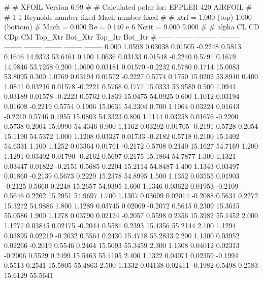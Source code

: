 #  
#       XFOIL         Version 6.99
#  
# Calculated polar for: EPPLER 420 AIRFOIL                              
#  
# 1 1 Reynolds number fixed          Mach number fixed         
#  
# xtrf =   1.000 (top)        1.000 (bottom)  
# Mach =   0.000     Re =     0.140 e 6     Ncrit =   9.000  9.000
#  
#   alpha    CL        CD       CDp       CM     Top_Xtr  Bot_Xtr  Top_Itr  Bot_Itr
#  ------ -------- --------- --------- -------- -------- -------- -------- --------
   0.000   1.0598   0.03038   0.01505  -0.2248   0.5813   0.1646  14.9373  53.6461
   0.100   1.0636   0.03133   0.01548  -0.2240   0.5791   0.1679  14.9846  53.7258
   0.200   1.0690   0.03181   0.01570  -0.2232   0.5780   0.1714  15.0083  53.8095
   0.300   1.0769   0.03194   0.01572  -0.2227   0.5774   0.1750  15.0202  53.8940
   0.400   1.0841   0.03216   0.01578  -0.2221   0.5768   0.1777  15.0333  53.9589
   0.500   1.0941   0.03189   0.01578  -0.2223   0.5762   0.1839  15.0475  54.0925
   0.600   1.1012   0.03194   0.01608  -0.2219   0.5754   0.1906  15.0631  54.2304
   0.700   1.1064   0.03224   0.01643  -0.2210   0.5746   0.1955  15.0803  54.3323
   0.800   1.1114   0.03258   0.01676  -0.2200   0.5738   0.2004  15.0990  54.4346
   0.900   1.1162   0.03292   0.01705  -0.2191   0.5728   0.2054  15.1190  54.5372
   1.000   1.1208   0.03327   0.01733  -0.2182   0.5718   0.2100  15.1402  54.6331
   1.100   1.1252   0.03364   0.01761  -0.2172   0.5708   0.2140  15.1627  54.7169
   1.200   1.1291   0.03402   0.01790  -0.2162   0.5697   0.2175  15.1864  54.7877
   1.300   1.1321   0.03447   0.01822  -0.2151   0.5685   0.2204  15.2114  54.8487
   1.400   1.1343   0.03497   0.01860  -0.2139   0.5673   0.2229  15.2378  54.8995
   1.500   1.1352   0.03555   0.01903  -0.2125   0.5660   0.2248  15.2657  54.9395
   1.600   1.1346   0.03622   0.01953  -0.2109   0.5646   0.2262  15.2951  54.9697
   1.700   1.1307   0.03699   0.02014  -0.2088   0.5631   0.2272  15.3272  54.9886
   1.800   1.1289   0.03745   0.02069  -0.2072   0.5615   0.2309  15.3615  55.0586
   1.900   1.1278   0.03790   0.02124  -0.2057   0.5598   0.2356  15.3982  55.1452
   2.000   1.1277   0.03845   0.02175  -0.2044   0.5581   0.2393  15.4356  55.2144
   2.100   1.1294   0.03895   0.02219  -0.2032   0.5564   0.2430  15.4718  55.2833
   2.200   1.1300   0.03952   0.02266  -0.2019   0.5546   0.2464  15.5093  55.3459
   2.300   1.1308   0.04012   0.02313  -0.2006   0.5529   0.2499  15.5463  55.4105
   2.400   1.1322   0.04071   0.02359  -0.1994   0.5513   0.2541  15.5805  55.4863
   2.500   1.1332   0.04138   0.02411  -0.1982   0.5498   0.2583  15.6129  55.5641
